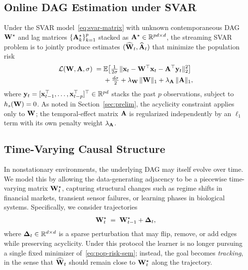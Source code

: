 \documentclass[journal,twoside]{IEEEtran}
\begin{document}
\subsection{Online DAG Estimation under SVAR}
\label{sec:problem-svar}
Under the SVAR model~\eqref{eq:svar-matrix} with unknown contemporaneous
DAG ${\mathbf W}^\star$ and lag matrices $\{{\mathbf A}_k^\star\}_{k=1}^{p}$
stacked as ${\mathbf A}^\star \in \mathbb{R}^{pd \times d}$, the streaming
SVAR problem is to jointly produce estimates
$(\widehat{{\mathbf W}}_t, \widehat{{\mathbf A}}_t)$ that minimize the population
risk
\begin{equation}
\label{eq:pop-risk-svar}
\begin{aligned}
\mathcal{L}({\mathbf W}, {\mathbf A}, \sigma)
\;=\;& \mathbb{E}\!\left[ \tfrac{1}{2\sigma}\,
  \|{\mathbf x}_t - {\mathbf W}^\top {\ensuremath{\mathbf x}}_t - {\mathbf A}^\top {\ensuremath{\mathbf y}}_t\|_2^2 \right]
\\
& + \tfrac{d\sigma}{2} + \lambda_{{\mathbf W}}\,\|{\mathbf W}\|_1
+ \lambda_{{\mathbf A}}\,\|{\mathbf A}\|_1,
\end{aligned}
\end{equation}
where ${\mathbf y}_t = [{\mathbf x}_{t-1}^\top, \ldots, {\mathbf x}_{t-p}^\top]^\top
\in \mathbb{R}^{pd}$ stacks the past $p$ observations, subject to
$h_s({\mathbf W}) = 0$. As noted in Section~\ref{sec:prelim}, the acyclicity
constraint applies only to ${\mathbf W}$; the temporal-effect matrix ${\mathbf A}$
is regularized independently by an $\ell_1$ term with its own penalty
weight $\lambda_{{\mathbf A}}$.

\subsection{Time-Varying Causal Structure}
\label{sec:problem-evolving}
In nonstationary environments, the underlying DAG may itself evolve over
time. We model this by allowing the data-generating adjacency to be a
piecewise time-varying matrix ${\mathbf W}^\star_t$, capturing structural
changes such as regime shifts in financial markets, transient sensor
failures, or learning phases in biological systems. Specifically, we
consider trajectories
\begin{equation}
\label{eq:evolving-w}
{\ensuremath{\mathbf W}}^\star_t \;=\; {\mathbf W}^\star_{t-1} + \boldsymbol{\Delta}_t,
\end{equation}
where $\boldsymbol{\Delta}_t \in \mathbb{R}^{d \times d}$ is a sparse perturbation
that may flip, remove, or add edges while preserving acyclicity. Under
this protocol the learner is no longer pursuing a single fixed minimizer
of~\eqref{eq:pop-risk-sem}; instead, the goal becomes \emph{tracking}, in
the sense that $\widehat{{\mathbf W}}_t$ should remain close to ${\mathbf W}^\star_t$
along the trajectory.
\end{document}
